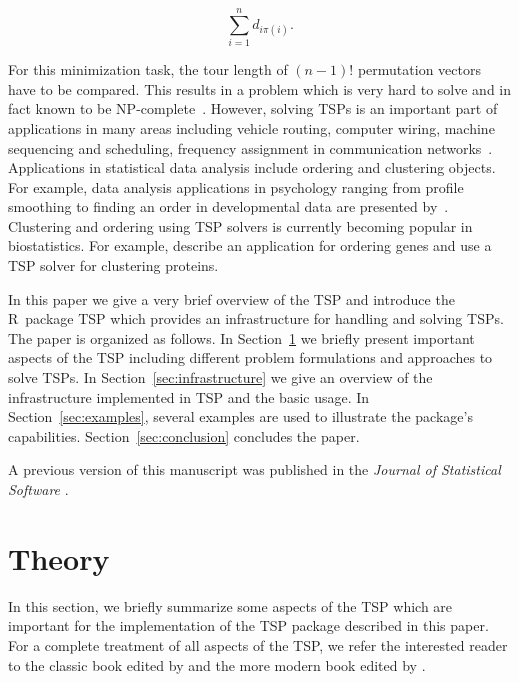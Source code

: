 \documentclass[10pt,a4paper,fleqn]{article}
\newcommand{\strong}[1]{{\normalfont\fontseries{b}\selectfont #1}}
\newcommand{\pkg}[1]{\strong{#1}}
\newcommand{\proglang}[1]{\textsf{#1}}
\begin{document}
\begin{equation}
    \sum_{i=1}^n d_{i\pi(i)}.
\end{equation}

For this minimization task, the tour length of $(n-1)!$ permutation
vectors have to be compared.  This results in a problem which is very
hard to solve and in fact known to be NP-complete~\citep{Johnson1985a}.
However, solving TSPs is an important part of applications in many areas
including vehicle routing, computer wiring, machine sequencing and
scheduling, frequency assignment in communication
networks~\citep{Lenstra1975, Punnen2002}.
Applications in statistical data analysis include ordering and
clustering objects.  For example, data analysis applications in
psychology ranging from profile smoothing to finding an order in
developmental data are presented by~\cite{Hubert1978}.  Clustering and
ordering using TSP solvers is currently becoming popular in
biostatistics.  For example, \cite{Ray2007} describe an application for
ordering genes and \cite{Johnson2006} use a TSP solver for clustering
proteins.

In this paper we give a very brief overview of the TSP and introduce the
\proglang{R}~package \pkg{TSP} which provides an infrastructure for
handling and solving TSPs.  The paper is organized as follows.  In
Section~\ref{sec:TSP} we briefly present important aspects of the TSP
including different problem formulations and approaches to solve TSPs.
In Section~\ref{sec:infrastructure} we give an overview of the
infrastructure implemented in \pkg{TSP} and the basic usage.  In
Section~\ref{sec:examples}, several examples are used to illustrate the
package's capabilities.  Section~\ref{sec:conclusion} concludes the
paper.

A previous version of this manuscript was published in the \emph{Journal
  of Statistical Software} \citep{TSP:Hahsler+Hornik2007}.

\section{Theory}\label{sec:TSP}

In this section, we briefly summarize some aspects of the TSP which are
important for the implementation of the \pkg{TSP} package described in
this paper.  For a complete treatment of all aspects of the TSP, we
refer the interested reader to the classic book edited by
\cite{Lawler1985} and the more modern book edited by \cite{Gutin2002}.
\end{document}
